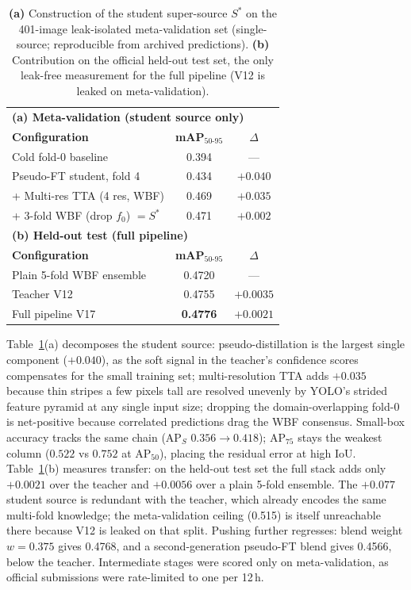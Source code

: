 \documentclass{article}
\begin{document}
\begin{table}[t]
\centering
\caption{\textbf{(a)} Construction of the student super-source $S^{*}$
on the 401-image leak-isolated meta-validation set (single-source;
reproducible from archived predictions). \textbf{(b)} Contribution on
the official held-out test set, the only leak-free measurement for the
full pipeline (V12 is leaked on meta-validation).}
\label{tab:ablation}
\small
\begin{tabular}{lcc}
\toprule
\multicolumn{3}{l}{\textbf{(a) Meta-validation (student source only)}}\\
\textbf{Configuration} & \textbf{mAP$_{50\text{-}95}$} & $\Delta$ \\
\midrule
Cold fold-0 baseline                  & 0.394 & --- \\
Pseudo-FT student, fold 4             & 0.434 & $+0.040$ \\
+ Multi-res TTA (4 res, WBF)          & 0.469 & $+0.035$ \\
+ 3-fold WBF (drop $f_0$) $= S^{*}$   & 0.471 & $+0.002$ \\
\midrule
\multicolumn{3}{l}{\textbf{(b) Held-out test (full pipeline)}}\\
\textbf{Configuration} & \textbf{mAP$_{50\text{-}95}$} & $\Delta$ \\
\midrule
Plain 5-fold WBF ensemble             & 0.4720 & --- \\
Teacher V12                           & 0.4755 & $+0.0035$ \\
Full pipeline V17                     & \textbf{0.4776} & $+0.0021$ \\
\bottomrule
\end{tabular}
\end{table}

Table~\ref{tab:ablation}(a) decomposes the student source:
pseudo-distillation is the largest single component ($+0.040$), as the
soft signal in the teacher's confidence scores compensates for the
small training set; multi-resolution TTA adds $+0.035$ because thin
stripes a few pixels tall are resolved unevenly by YOLO's strided
feature pyramid at any single input size; dropping the
domain-overlapping fold-0 is net-positive because correlated
predictions drag the WBF consensus. Small-box accuracy tracks the same
chain (AP$_S$ $0.356\!\to\!0.418$); AP$_{75}$ stays the weakest column
($0.522$ vs $0.752$ at AP$_{50}$), placing the residual error at high
IoU. Table~\ref{tab:ablation}(b) measures transfer: on the held-out test set the full stack adds only
$+0.0021$ over the teacher and $+0.0056$ over a plain 5-fold ensemble.
The $+0.077$ student source is redundant with the teacher, which
already encodes the same multi-fold knowledge; the meta-validation
ceiling (0.515) is itself unreachable there because V12 is leaked on
that split. Pushing further regresses: blend weight $w{=}0.375$ gives
0.4768, and a second-generation pseudo-FT blend gives 0.4566, below the
teacher. Intermediate stages were scored only on meta-validation, as
official submissions were rate-limited to one per 12\,h.
\end{document}
